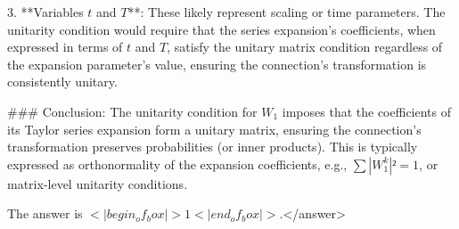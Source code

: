 3. **Variables \( t \) and \( T \)**: These likely represent scaling or time parameters. The unitarity condition would require that the series expansion’s coefficients, when expressed in terms of \( t \) and \( T \), satisfy the unitary matrix condition regardless of the expansion parameter’s value, ensuring the connection’s transformation is consistently unitary.  

### Conclusion:  
The unitarity condition for \( W_1 \) imposes that the coefficients of its Taylor series expansion form a unitary matrix, ensuring the connection’s transformation preserves probabilities (or inner products). This is typically expressed as orthonormality of the expansion coefficients, e.g., \( \sum |W_1^k|² = 1 \), or matrix-level unitarity conditions.  

The answer is \(<|begin_of_box|>1<|end_of_box|>\).</answer>